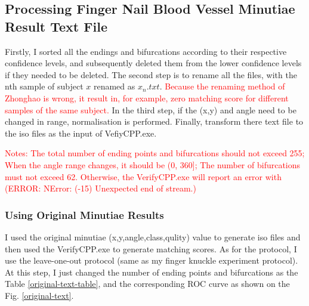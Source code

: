 \subsection{Processing Finger Nail Blood Vessel Minutiae Result Text File}
Firstly, I sorted all the endings and bifurcations according to their respective confidence levels, and subsequently deleted them from the lower confidence levels if they needed to be deleted. The second step is to rename all the files, with the nth sample of subject $x$ renamed as $x_n.txt$. \textcolor{red}{ Because the renaming method of Zhonghao is wrong, it result in, for example, zero matching score for different samples of the same subject.} In the third step, if the (x,y) and angle need to be changed in range, normalisation is performed. Finally, transform there text file to the iso files as the input of VefiyCPP.exe.

\textcolor{red}{Notes: The total number of ending points and bifurcations should not exceed 255; When the angle range changes, it should be (0, 360]; The number of bifurcations must not exceed 62. Otherwise, the VerifyCPP.exe will report an error with (ERROR: NError: (-15) Unexpected end of stream.)}

\subsubsection{Using Original Minutiae Results}
I used the original minutiae (x,y,angle,class,qulity) value to generate iso files and then used the VerifyCPP.exe to generate matching scores. As for the protocol, I use the leave-one-out protocol (same as my finger knuckle experiment protocol). At this step, I just changed the number of ending points and bifurcations as the Table \ref{original-text-table}, and the corresponding ROC curve as shown on the Fig. \ref{original-text}.

